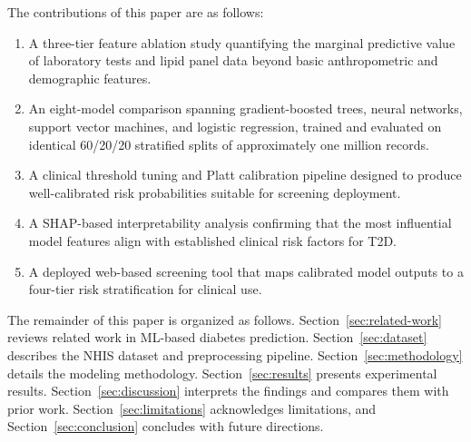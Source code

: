 The contributions of this paper are as follows:
\begin{enumerate}
    \item A three-tier feature ablation study quantifying the marginal predictive value of laboratory tests and lipid panel data beyond basic anthropometric and demographic features.
    \item An eight-model comparison spanning gradient-boosted trees, neural networks, support vector machines, and logistic regression, trained and evaluated on identical 60/20/20 stratified splits of approximately one million records.
    \item A clinical threshold tuning and Platt calibration pipeline designed to produce well-calibrated risk probabilities suitable for screening deployment.
    \item A SHAP-based interpretability analysis confirming that the most influential model features align with established clinical risk factors for T2D.
    \item A deployed web-based screening tool that maps calibrated model outputs to a four-tier risk stratification for clinical use.
\end{enumerate}
The remainder of this paper is organized as follows. Section~\ref{sec:related-work} reviews related work in ML-based diabetes prediction. Section~\ref{sec:dataset} describes the NHIS dataset and preprocessing pipeline. Section~\ref{sec:methodology} details the modeling methodology. Section~\ref{sec:results} presents experimental results. Section~\ref{sec:discussion} interprets the findings and compares them with prior work. Section~\ref{sec:limitations} acknowledges limitations, and Section~\ref{sec:conclusion} concludes with future directions.
